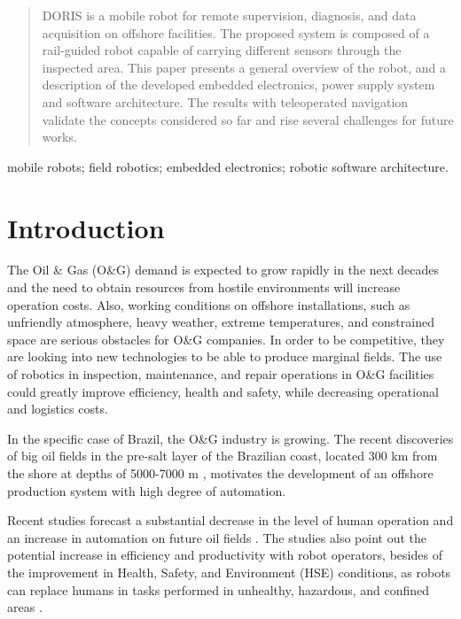 \documentclass{ifacconf}
\begin{document}
\begin{frontmatter}
\begin{abstract}                %
DORIS is a mobile robot for remote supervision, diagnosis, and data acquisition
on offshore facilities. The proposed system is composed of a rail-guided robot
capable of carrying different sensors through the inspected area. This paper
presents a general overview of the robot, and a description of the developed
embedded electronics, power supply system and software architecture. The
results with teleoperated navigation validate the concepts considered so far
and rise several challenges for future works.
\end{abstract}

\begin{keyword}
mobile robots; field robotics; embedded electronics; robotic
software architecture.
\end{keyword}

\end{frontmatter}

\section{Introduction}
The Oil \& Gas (O\&G) demand is expected to grow rapidly in the next decades
\citep{wna} and the need to obtain resources from hostile environments will
increase operation costs. Also, working conditions on offshore installations, such as
unfriendly atmosphere, heavy weather, extreme temperatures, and constrained
space are serious obstacles for O\&G companies. In order to be competitive, they
are looking into new technologies to be able to produce marginal fields. The
use of robotics in inspection, maintenance, and repair operations in O\&G
facilities could greatly improve efficiency, health and safety, while
decreasing operational and logistics costs.

In the specific case of Brazil, the O\&G industry is growing. The
recent discoveries of big oil fields in the pre-salt layer of the Brazilian
coast, located 300 km from the shore at depths of 5000-7000 m \citep{presal},
motivates the development of an offshore production system with high degree of
automation.

Recent studies forecast a substantial decrease in the level of human operation
and an increase in automation on future oil fields
\citep{skourup2009robotized}. The studies also point out the potential increase
in efficiency and productivity with robot operators, besides of the improvement
in Health, Safety, and Environment (HSE) conditions, as robots can replace
humans in tasks performed in unhealthy, hazardous, and confined areas
\citep{pal}.
\end{document}
